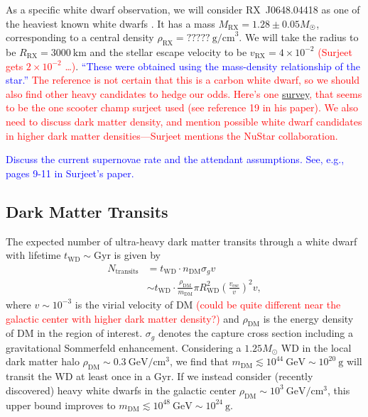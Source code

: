 \documentclass[twocolumn,showpacs,preprintnumbers,amsmath,amssymb,prd]{revtex4}
\newcommand{\GeV}{\text{GeV}}
\def\r{\right)}
\def\l{\left(}
\begin{document}
As a specific white dwarf observation, we will consider RX~J0648.04418 as one of the heaviest known white dwarfs \cite{Mereghetti}. It has a mass $M_\text{RX} = 1.28\pm0.05 M_{\astrosun}$, corresponding to a central density $\rho_\text{RX} = ?????~\text{g/cm}^3$. We will take the radius to be $R_\text{RX} = 3000~\text{km}$ and the stellar escape velocity to be $v_\text{RX} = 4\times 10^{-2}$ \textcolor{red}{(Surjeet gets $2\times 10^{-2}$ \ldots)}. \textcolor{blue}{``These were obtained using the mass-density relationship of the star.''} \textcolor{red}{The reference is not certain that this is a carbon white dwarf, so we should also find other heavy candidates to hedge our odds. Here's one \href{https://heasarc.gsfc.nasa.gov/db-perl/W3Browse/w3hdprods.pl}{survey}, that seems to be the one scooter champ surjeet used (see reference 19 in his paper). We also need to discuss dark matter density, and mention possible white dwarf candidates in higher dark matter densities---Surjeet mentions the NuStar collaboration.}

\textcolor{blue}{Discuss the current supernovae rate and the attendant assumptions. See, e.g., pages 9-11 in Surjeet's paper.}

\subsection{Dark Matter Transits}
\label{sec:TransitConstraints}

The expected number of ultra-heavy dark matter transits through a white dwarf with lifetime $t_\text{WD} \sim \text{Gyr}$ is given by
\begin{align}
N_\text{transits}  &= t_\text{WD} \cdot n_\text{DM} \sigma_g v \\
 &  \sim t_\text{WD} \cdot \frac{\rho_{\text{DM}}}{m_\text{DM}} \pi R_\text{WD}^2 \l\frac{v_\text{esc}}{v}\r^2 v,
\end{align}
where $v \sim 10^{-3}$ is the virial velocity of DM \textcolor{red}{(could be quite different near the galactic center with higher dark matter density?)} and $\rho_{\text{DM}}$ is the energy density of DM in the region of interest. $\sigma_g$ denotes the capture cross section including a gravitational Sommerfeld enhancement. Considering a $1.25 M_{\odot}$ WD in the local dark matter halo $\rho_{\text{DM}} \sim 0.3 ~\text{GeV}/\text{cm}^3$, we find that $m_\text{DM} \lesssim 10^{44} ~\GeV \sim 10^{20} ~\text{g}$ will transit the WD at least once in a Gyr. If we instead consider (recently discovered) heavy white dwarfs in the galactic center $\rho_{\text{DM}} \sim 10^3 ~\text{GeV}/\text{cm}^3$, this upper bound improves to $m_\text{DM} \lesssim 10^{48} ~\GeV \sim 10^{24} ~\text{g}$.
\end{document}
